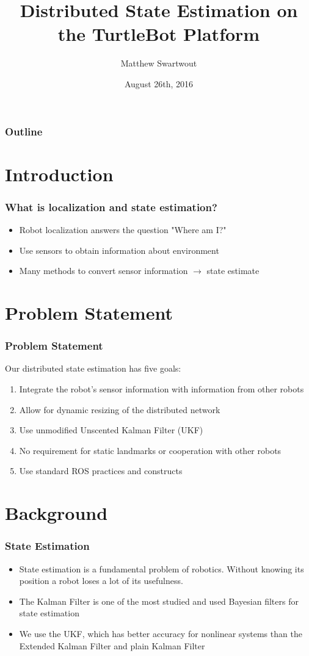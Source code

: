 \documentclass[14pt]{beamer}
\title{Distributed State Estimation on the TurtleBot Platform}
\author{Matthew Swartwout}
\date{August 26th, 2016}
\begin{document}
\begin{frame}
    \titlepage
\end{frame}

\begin{frame}
\frametitle{Outline}
\tableofcontents
\end{frame}

\section{Introduction}
\begin{frame}
\frametitle{What is localization and state estimation?}
\begin{itemize}
\item Robot localization answers the question "Where am I?"
\item Use sensors to obtain information about environment
\item Many methods to convert sensor information $\rightarrow$ state estimate 
\end{itemize}
\end{frame}

\section{Problem Statement}
\begin{frame}
\frametitle{Problem Statement}
Our distributed state estimation has five goals:
\begin{enumerate}
\item Integrate the robot's sensor information with information from other robots
\item Allow for dynamic resizing of the distributed network
\item Use unmodified Unscented Kalman Filter (UKF)
\item No requirement for static landmarks or cooperation with other robots
\item Use standard ROS practices and constructs
\end{enumerate}
\end{frame}

\section{Background}

\begin{frame}
\frametitle{State Estimation}
\begin{itemize}
\item State estimation is a fundamental problem of robotics. Without knowing its position a robot loses a lot of its usefulness.
\item The Kalman Filter is one of the most studied and used Bayesian filters for state estimation~\cite{Localization2003, Mohsin2014}
\item We use the UKF, which has better accuracy for nonlinear systems than the Extended Kalman Filter and plain Kalman Filter
\end{itemize}
\end{frame}
\end{document}
